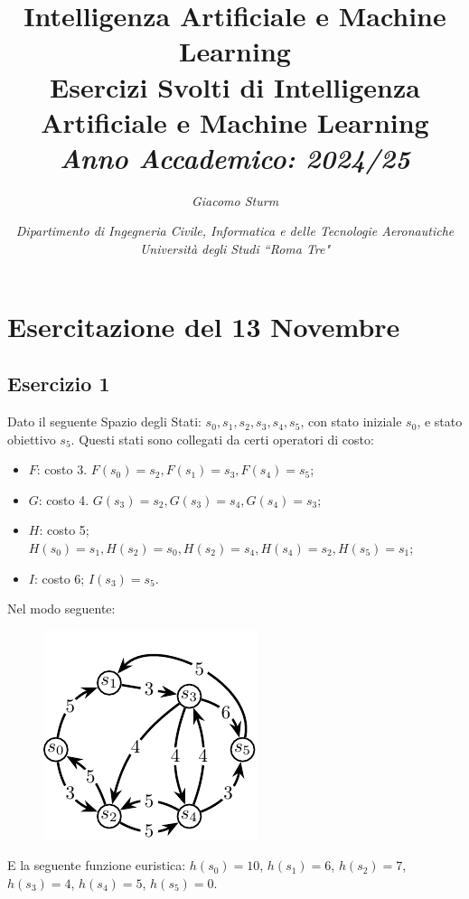 \documentclass{article}
\numberwithin{equation}{section}
\begin{document}
\title{%
    \textbf{Intelligenza Artificiale e Machine Learning}  \\ 
    \large Esercizi Svolti di Intelligenza Artificiale e Machine Learning \\
    \textit{Anno Accademico: 2024/25}}
\author{\textit{Giacomo Sturm}}
\date{\textit{Dipartimento di Ingegneria Civile, Informatica e delle Tecnologie Aeronautiche \\
Università degli Studi ``Roma Tre"}}

\maketitle
\thispagestyle{link}

\clearpage


\pagestyle{fancy}
\fancyhead{}\fancyfoot{}
\fancyfoot[C]{\thepage}

\tableofcontents

\clearpage
{}

\section{Esercitazione del 13 Novembre}

\subsection{Esercizio 1}

Dato il seguente Spazio degli Stati: $s_0,s_1,s_2,s_3,s_4,s_5$, con stato iniziale $s_0$, e stato obiettivo $s_5$. 
Questi stati sono collegati da certi operatori di costo:
\begin{itemize}
    \item $F$: costo 3. $F(s_0)=s_2, F(s_1)=s_3, F(s_4)=s_5$;
    \item $G$: costo 4. $G(s_3)=s_2, G(s_3)=s_4, G(s_4)=s_3$;
    \item $H$: costo 5; $H(s_0)=s_1, H(s_2)=s_0, H(s_2)=s_4, H(s_4)=s_2, H(s_5)=s_1$;
    \item $I$: costo 6; $I(s_3)=s_5$.
\end{itemize}
Nel modo seguente: 

\begin{figure}[H]%
    \centering%
    \includegraphics[scale=1.2]{grafo_esercitazione_1.pdf}%
\end{figure}
E la seguente funzione euristica: $h(s_0)=10$, $h(s_1)=6$, $h(s_2)=7$, $h(s_3)=4$, $h(s_4)=5$, $h(s_5)=0$. 
\end{document}
